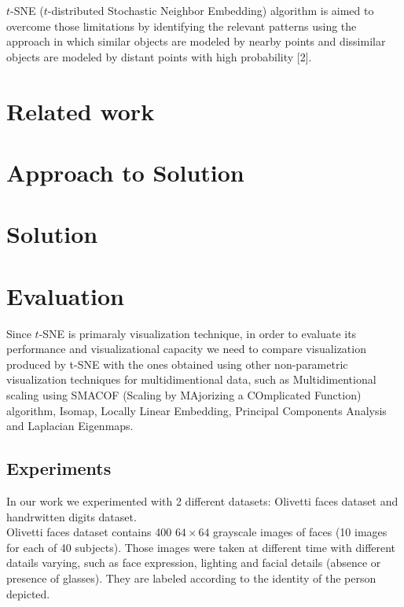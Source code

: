$t$-SNE ($t$-distributed Stochastic Neighbor Embedding) algorithm is aimed to overcome those limitations by identifying the relevant patterns using the approach in which similar objects are modeled by nearby points and dissimilar objects are modeled by distant points with high probability [2]. 

\section{Related work}

\section{Approach to Solution}

\section{Solution}

\section{Evaluation}

Since $t$-SNE is primaraly visualization technique, in order to evaluate its performance and visualizational capacity we need to compare visualization produced by t-SNE with the ones obtained using other non-parametric visualization techniques for multidimentional data, such as Multidimentional scaling using SMACOF (Scaling by MAjorizing a COmplicated Function) algorithm, Isomap, Locally Linear Embedding, Principal Components Analysis and Laplacian Eigenmaps.\\

\subsection{Experiments}

In our work we experimented with 2 different datasets: Olivetti faces dataset and handrwitten digits dataset.\\ 

Olivetti faces dataset contains 400 $64 \times 64$ grayscale images of faces (10 images for each of 40 subjects). Those images were taken at different time with different datails varying, such as face expression, lighting and facial details (absence or presence of glasses). They are labeled according to the identity of the person depicted.\\

